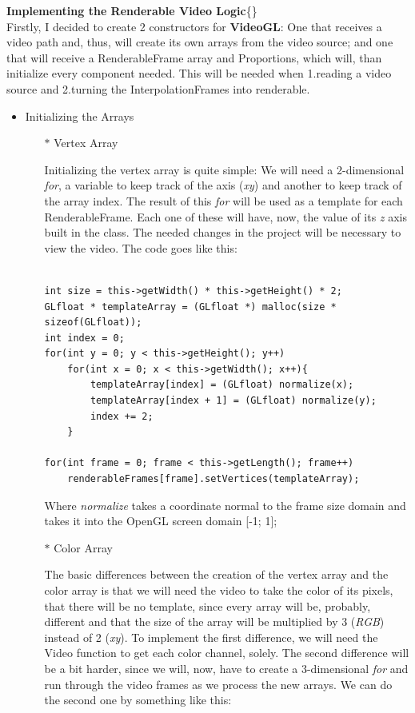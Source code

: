 \documentclass[12pt, a4paper]{report}
\newenvironment{loggentry}[2]%
{\noindent\textbf{#2}\newline\{\marginnote{#1}\}\newline\\}{\vspace{1.0cm}}
\begin{document}
	\begin{loggentry}{06-06-2019}{Implementing the Renderable Video Logic}		

		Firstly, I decided to create 2 constructors for \textbf{VideoGL}:
		One that receives a video path and, thus, will create its own arrays from the video source;
		and one that will receive a RenderableFrame array and Proportions, which will, than initialize every component needed.
		This will be needed when 1.reading a video source and 2.turning the InterpolationFrames into renderable.
		
		\begin{itemize}
				\item Initializing the Arrays

					\begin{itemize}
							\item[$\ast$] Vertex Array

								Initializing the vertex array is quite simple:
								We will need a 2-dimensional \textit{for}, a variable to keep track of the axis (\textit{xy}) and another to keep track of the array index.
								The result of this \textit{for} will be used as a template for each RenderableFrame.
								Each one of these will have, now, the value of its \textit{z} axis built in the class.
								The needed changes in the project will be necessary to view the video.
								The code goes like this:
	
							\begin{verbatim}

int size = this->getWidth() * this->getHeight() * 2;
GLfloat * templateArray = (GLfloat *) malloc(size * sizeof(GLfloat));
int index = 0;
for(int y = 0; y < this->getHeight(); y++)
	for(int x = 0; x < this->getWidth(); x++){
		templateArray[index] = (GLfloat) normalize(x);
		templateArray[index + 1] = (GLfloat) normalize(y);
		index += 2;
	}

for(int frame = 0; frame < this->getLength(); frame++)
	renderableFrames[frame].setVertices(templateArray);

							\end{verbatim}

							Where \textit{normalize} takes a coordinate normal to the frame size domain and takes it into the OpenGL screen domain [-1; 1];

							\item[$\ast$] Color Array

								The basic differences between the creation of the vertex array and the color array is that we will need the video to take the color of its pixels, that there will be no template, since every array will be, probably, different and that the size of the array will be multiplied by 3 (\textit{RGB}) instead of 2 (\textit{xy}).
								To implement the first difference, we will need the Video function to get each color channel, solely.
								The second difference will be a bit harder, since we will, now, have to create a 3-dimensional \textit{for} and run through the video frames as we process the new arrays.
								We can do the second one by something like this:


\end{itemize}
\end{itemize}
\end{loggentry}
\end{document}
